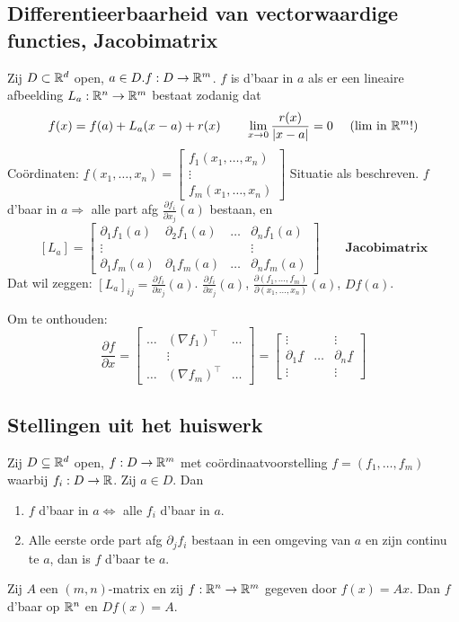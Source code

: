 \documentclass{2wa40summary}
\begin{document}
		\subsection{Differentieerbaarheid van vectorwaardige functies, Jacobimatrix}
			Zij $D \subset \mathbb{R}^d$ open, $a \in D. f: D \rightarrow \mathbb{R}^m$. $f$ is d'baar in $a$ als er een lineaire afbeelding $L_a :\mathbb{R}^n \rightarrow \mathbb{R}^m$ bestaat zodanig dat \[f(x)=f(a)+L_a (x-a) + r(x) \qquad \lim_{x \rightarrow 0} \frac{r(x)}{|x-a|} =0 \quad\text{ (lim in } \mathbb{R}^m \text{!)}\]
			Co\"ordinaten: $\underline{f}(x_1,\dots ,x_n)=\begin{bmatrix}
				f_1 (x_1, \dots ,x_n) \\
				\vdots \\
				f_m (x_1, \dots ,x_n)
			\end{bmatrix}$
			\theorem[en definitie] Situatie als beschreven. $f$ d'baar in $a \Rightarrow$ alle part afg $\frac{\partial f_i}{\partial x_j}(a)$ bestaan, en
			\[[L_a] = \begin{bmatrix}
				\partial_1 f_1 (a) & \partial_2 f_1 (a) & \dots &\partial_n f_1 (a) \\
				\vdots & & & \vdots \\
				\partial_1 f_m (a) & \partial_1 f_m (a) & \dots &\partial_n f_m (a)
			\end{bmatrix} \qquad \textbf{Jacobimatrix}\]
			Dat wil zeggen: $[L_a]_{ij}=\frac{\partial f_i}{\partial x_j}(a)$.
			\nota $\frac{\partial f_i}{\partial x_j}(a)$, $\frac{\partial (f_1,\dots,f_m)}{\partial (x_1,\dots,x_n)}(a)$, $ Df(a) $.
			
			Om te onthouden:
			\[ \frac{\partial f}{\partial x} = \begin{bmatrix}
			\dots & (\nabla f_1)^\top & \dots \\
			& \vdots & \\
			\dots & (\nabla f_m)^\top & \dots
			\end{bmatrix} =
			\begin{bmatrix}
			\vdots & & \vdots \\
			\partial_1 \underline{f} & \dots & \partial_n \underline{f} \\
			\vdots & & \vdots
			\end{bmatrix}\]
			
		\subsection{Stellingen uit het huiswerk}
			\theorem Zij $ D \subseteq \mathbb{R}^d $ open, $ f: D \rightarrow \mathbb{R}^m $ met co\"ordinaatvoorstelling $ f=(f_1,\dots,f_m) $ waarbij $ f_i : D \rightarrow \mathbb{R} $. Zij $ a \in D $. Dan
			\begin{enumerate}[(1)]
				\item $ f $ d'baar in $ a \Leftrightarrow $ alle $ f_i $ d'baar in $ a $.
				\item Alle eerste orde part afg $ \partial_j f_i $ bestaan in een omgeving van $ a $ en zijn continu te $ a $, dan is $ f $ d'baar te $ a $.
			\end{enumerate}
			\theorem Zij $ A $ een $ (m,n) $-matrix en zij $ f:\mathbb{R}^n \rightarrow \mathbb{R}^m $ gegeven door $ f(x)=Ax $. Dan $ f $ d'baar op $ \mathbb{R}^n $ en $ Df(x) = A $.
			
\end{document}
